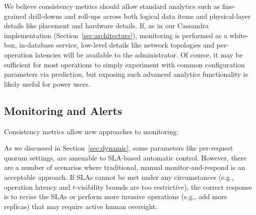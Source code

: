 We believe consistency metrics should allow standard analytics such as
fine-grained drill-downs and roll-ups across both logical data items
and physical-layer details like placement and hardware details. If, as
in our Cassandra implementation (Section~\ref{sec:architecture}),
monitoring is performed as a white-box, in-database service, low-level
details like network topologies and per-operation latencies will be
available to the administrator. Of course, it may be sufficient for most
operations to simply experiment with common configuration parameters via
prediction, but exposing such advanced analytics functionality is
likely useful for power users.

\subsection{Monitoring and Alerts}
\label{sec:monitoring}

Consistency metrics allow new approaches to monitoring:


As we discussed in Section~\ref{sec:dynamic}, some parameters like
per-request quorum settings, are amenable to SLA-based automatic
control. However, there are a number of scenarios where traditional,
manual monitor-and-respond is an acceptable approach. If SLAs cannot
be met under any circumstances (e.g., operation latency and
$t$-visibility bounds are too restrictive), the correct response is to
revise the SLAs or perform more invasive operations (e.g., add more
replicas) that may require active human oversight.
